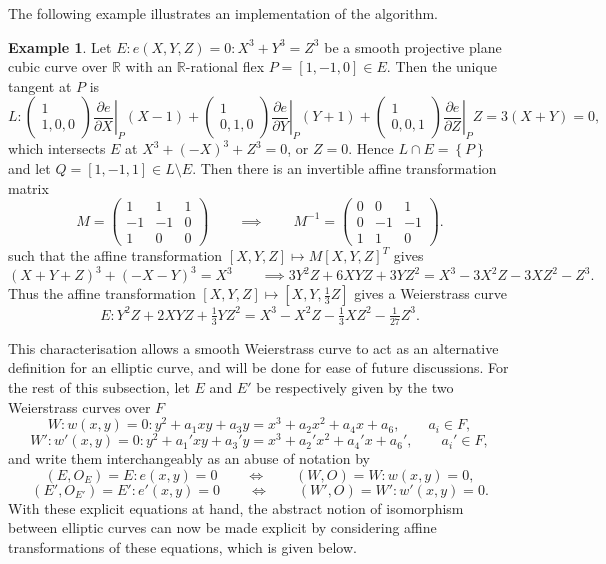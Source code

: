 \documentclass{article}
\newcommand{\R}{\mathbb{R}}
\newcommand{\val}[1]{\left. #1 \right\rvert}
\newcommand{\rb}[1]{\left( #1 \right)}
\renewcommand{\sb}[1]{\left[ #1 \right]}
\newcommand{\cb}[1]{\left\{ #1 \right\}}
\newcommand{\two}[2]{\begin{pmatrix} #1 \\ #2 \end{pmatrix}}
\theoremstyle{definition}\newtheorem*{definition}{Definition}
\theoremstyle{definition}\newtheorem*{example}{Example}
\theoremstyle{definition}\newtheorem*{remark}{Remark}
\begin{document}
The following example illustrates an implementation of the algorithm.

\begin{example}
Let $ E : e\rb{X, Y, Z} = 0 : X^3 + Y^3 = Z^3 $ be a smooth projective plane cubic curve over $ \R $ with an $ \R $-rational flex $ P = \sb{1, -1, 0} \in E $. Then the unique tangent at $ P $ is
$$ L : \two{1}{1, 0, 0}\val{\dfrac{\partial e}{\partial X}}_P\rb{X - 1} + \two{1}{0, 1, 0}\val{\dfrac{\partial e}{\partial Y}}_P\rb{Y + 1} + \two{1}{0, 0, 1}\val{\dfrac{\partial e}{\partial Z}}_PZ = 3\rb{X + Y} = 0, $$
which intersects $ E $ at $ X^3 + \rb{-X}^3 + Z^3 = 0 $, or $ Z = 0 $. Hence $ L \cap E = \cb{P} $ and let $ Q = \sb{1, -1, 1} \in L \setminus E $. Then there is an invertible affine transformation matrix
$$ M = \begin{pmatrix} 1 & 1 & 1 \\ -1 & -1 & 0 \\ 1 & 0 & 0 \end{pmatrix} \qquad \implies \qquad M^{-1} = \begin{pmatrix} 0 & 0 & 1 \\ 0 & -1 & -1 \\ 1 & 1 & 0 \end{pmatrix}. $$
such that the affine transformation $ \sb{X, Y, Z} \mapsto M\sb{X, Y, Z}^{T} $ gives
$$ \rb{X + Y + Z}^3 + \rb{-X - Y}^3 = X^3 \qquad \implies 3Y^2Z + 6XYZ + 3YZ^2 = X^3 - 3X^2Z - 3XZ^2 - Z^3. $$
Thus the affine transformation $ \sb{X, Y, Z} \mapsto \sb{X, Y, \tfrac{1}{3}Z} $ gives a Weierstrass curve
$$ E : Y^2Z + 2XYZ + \tfrac{1}{3}YZ^2 = X^3 - X^2Z - \tfrac{1}{3}XZ^2 - \tfrac{1}{27}Z^3. $$
\end{example}

This characterisation allows a smooth Weierstrass curve to act as an alternative definition for an elliptic curve, and will be done for ease of future discussions. For the rest of this subsection, let $ E $ and $ E' $ be respectively given by the two Weierstrass curves over $ F $
$$ W : w\rb{x, y} = 0 : y^2 + a_1xy + a_3y = x^3 + a_2x^2 + a_4x + a_6, \qquad a_i \in F, $$
$$ W' : w'\rb{x, y} = 0 : y^2 + a_1'xy + a_3'y = x^3 + a_2'x^2 + a_4'x + a_6', \qquad a_i' \in F, $$
and write them interchangeably as an abuse of notation by
$$ \rb{E, O_E} = E : e\rb{x, y} = 0 \qquad \iff \qquad \rb{W, O} = W : w\rb{x, y} = 0, $$
$$ \rb{E', O_{E'}} = E' : e'\rb{x, y} = 0 \qquad \iff \qquad \rb{W', O} = W' : w'\rb{x, y} = 0. $$
With these explicit equations at hand, the abstract notion of isomorphism between elliptic curves can now be made explicit by considering affine transformations of these equations, which is given below.
\end{document}

